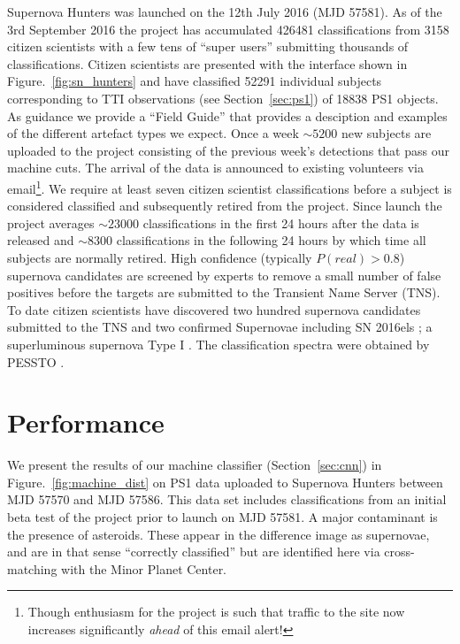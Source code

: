 \message{ !name(blank.tex)}\documentclass[a4paper,fleqn,usenatbib]{mnras}
\begin{document}
Supernova Hunters was launched on the 12th July 2016 (MJD 57581).  As of the 3rd September 2016 the project has accumulated 426481 classifications from 3158 citizen scientists with a few tens of ``super users'' submitting thousands of classifications.  Citizen scientists are presented with the interface shown in Figure.~\ref{fig:sn_hunters} and have classified 52291 individual subjects corresponding to TTI observations (see Section~\ref{sec:ps1}) of 18838 PS1 objects. As guidance we provide a ``Field Guide'' that provides a desciption and examples of the different artefact types we expect.  Once a week $\sim5200$ new subjects are uploaded to the project consisting of the previous week's detections that pass our machine cuts. The arrival of the data is announced to existing volunteers via email\footnote{Though enthusiasm for the project is such that traffic to the site now increases significantly \emph{ahead} of this email alert!}. We require at least seven citizen scientist classifications before a subject is considered classified and subsequently  retired from the project.  Since launch the project averages $\sim23000$ classifications in the first 24 hours after the data is released and $\sim8300$ classifications in the following 24 hours by which time all subjects are normally retired. High confidence (typically $P(real)>0.8$) supernova candidates are screened by experts to remove a small number of false positives before the targets are submitted to the Transient Name Server (TNS).  To date citizen scientists have discovered two hundred supernova candidates submitted to the TNS and two confirmed Supernovae including SN 2016els \citep{Mattila16}; a superluminous supernova Type I \citep{Gal-Yam12}.  The classification spectra were obtained by PESSTO \citep{Smartt15}.


\section{Performance}
\label{sec:perform}

We present the results of our machine classifier (Section~\ref{sec:cnn}) in Figure.~\ref{fig:machine_dist} on PS1 data uploaded to Supernova Hunters between MJD 57570 and MJD 57586. This data set includes classifications from an initial beta test of the project prior to launch on MJD 57581.  A major contaminant is the presence of asteroids. These appear in the difference image as  supernovae, and are in that sense ``correctly classified'' but are identified here via cross-matching with the Minor Planet Center.
\end{document}
